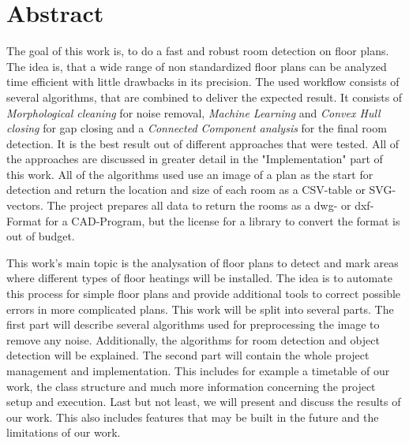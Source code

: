 \section{Abstract}
The goal of this work is, to do a fast and robust room detection on floor plans. The idea is, that a wide range of non standardized floor plans can be analyzed time efficient with little drawbacks in its precision.
The used workflow consists of several algorithms, that are combined to deliver the expected result. It consists of \textit{Morphological cleaning} for noise removal, \textit{Machine Learning} and \textit{Convex Hull closing} for gap closing and a \textit{Connected Component analysis} for the final room detection. It is the best result out of different approaches that were tested. All of the approaches are discussed in greater detail in the "Implementation" part of this work. All of the algorithms used use an image of a plan  as the start for detection and return the location and size of each room as a CSV-table or SVG-vectors. The project prepares all data to return the rooms as a dwg- or dxf-Format for a CAD-Program, but the license for a library to convert the format is out of budget.

This work's main topic is the analysation of floor plans to detect and mark areas where different types of floor heatings will be installed. The idea is to automate this process for simple floor plans and provide additional tools to correct possible errors in more complicated plans.
This work will be split into several parts. The first part will describe several algorithms used for preprocessing the image to remove any noise. Additionally, the algorithms for room detection and object detection will be explained.
The second part will contain the whole project management and implementation. This includes for example a timetable of our work, the class structure and much more information concerning the project setup and execution.
Last but not least, we will present and discuss the results of our work. This also includes features that may be built in the future and the limitations of our work.